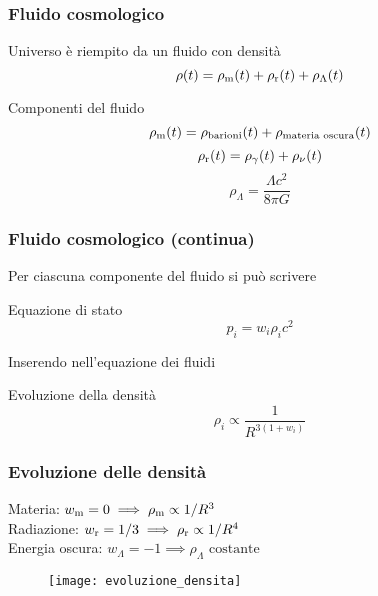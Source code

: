\begin{frame}
  \frametitle{Fluido cosmologico}
  Universo è riempito da un fluido con densità
  \begin{equation*}
    \rho(t) = \rho_{\textup{m}}(t) + \rho_{\textup{r}}(t) + \rho_\Lambda(t)
  \end{equation*}
  \pause{}
  \begin{block}{Componenti del fluido}
    \begin{equation*}
      \rho_{\textup{m}}(t) = \rho_{\textup{barioni}}(t) + \rho_{\textup{materia
          oscura}}(t)
    \end{equation*}
    \pause{}
    \begin{equation*}
      \rho_{\textup{r}}(t) = \rho_\gamma(t) + \rho_\nu(t)
    \end{equation*}
    \pause{}
    \begin{equation*}
      \rho_\Lambda = \frac{\Lambda c^2}{8\pi G}
    \end{equation*}
  \end{block}
\end{frame}

\begin{frame}
  \frametitle{Fluido cosmologico (continua)}
  Per ciascuna componente del fluido si può scrivere
  \begin{block}{Equazione di stato}
    \begin{equation*}
      p_i = w_i \rho_i c^2
    \end{equation*}
  \end{block}
  \pause{}
  Inserendo nell'equazione dei fluidi
  \begin{block}{Evoluzione della densità}
    \begin{equation*}
      \rho_i \propto \frac{1}{R^{3(1+w_i)}}
    \end{equation*}
  \end{block}
\end{frame}

\begin{frame}
  \frametitle{Evoluzione delle densità}
  Materia: $w_{\textup{m}} = 0 \implies \rho_{\textup{m}} \propto 1/R^3$ \\
  Radiazione: $w_{\textup{r}} = 1/3 \implies \rho_{\textup{r}} \propto 1/R^4$ \\
  Energia oscura: $w_\Lambda = -1 \implies \rho_\Lambda \text{ costante}$
  \begin{figure}
    \centering
    \texttt{[image: evoluzione\_densita]}
  \end{figure}
\end{frame}

